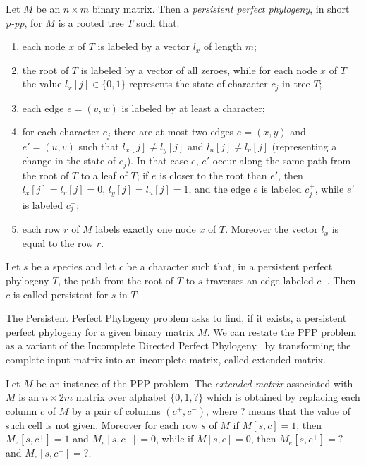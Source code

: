 \begin{definition}
\label{def:persistent-perfect-phylogeny}
Let $M$ be an  $n \times m$ binary matrix.
Then a \emph{persistent perfect phylogeny}, in short  \emph{ p-pp},
for $M$ is a rooted tree $T$ such that:
\begin{enumerate}
\item each node $x$ of $T$ is labeled by a vector $l_x$ of length $m$;
\item
  the root of $T$ is labeled by a vector of all zeroes,  while  for each  node
$x$ of $T$ the value $l_x[j]\in\{0, 1\}$
  represents the state of character $c_j$ in tree $T$;
\item
  each edge $e=(v,w)$ is labeled by at least a character;
\item
  for each character $c_j$ there are at most  two  edges $e=(x,y)$ and
$e'=(u,v)$
  such that $l_x[j] \neq l_y[j]$ and $l_u[j] \neq l_v[j]$
  (representing a change in the state of $c_j$).
In that case $e$, $e'$  occur along the same path
  from the root of $T$ to a leaf of $T$; if $e$ is closer to the root than $e'$,
  then $l_x[j]=l_v[j]=0$, $l_y[j]=l_u[j]=1$, and
  the  edge $e$ is labeled $c_j^{+}$,
  while  $e'$ is labeled $c_j^{-}$;
\item
  each row $r$ of $M$ labels exactly one node $x$ of $T$.
  Moreover the vector $l_{x}$ is equal to the row $r$.
\end{enumerate}
\end{definition}

Let $s$ be a species and let $c$ be a character such that, in a persistent
perfect phylogeny $T$, the path from the root of $T$ to $s$ traverses an edge
labeled $c^{-}$.
Then $c$ is called persistent for $s$ in $T$.

The Persistent Perfect Phylogeny problem asks to find, if it exists, a
persistent perfect phylogeny for a given binary matrix $M$.
We can restate the PPP  problem  as a
variant  of the Incomplete Directed Perfect Phylogeny~\cite{Sha} by transforming
the complete input matrix into an incomplete matrix, called extended matrix.

\begin{definition}
\label{def:Extended-Matrix}
Let $M$ be an instance of the PPP problem. The \emph{extended matrix}
associated with $M$ is an ${n \times 2m}$ matrix \me  over alphabet $\{0,1,?\}$
which is obtained by replacing each column $c$ of $M$ by a pair of columns
$(c^{+}, c^{-})$, where $?$ means that the value of such cell is not given.
Moreover for each   row $s$  of $M$
if $M[s,c] = 1$, then  $M_e[s,c^{+}] = 1$ and $M_e[s,c^{-}] = 0$,
while if $M[s,c] = 0$, then  $M_e[s,c^{+}] = ?$ and $M_e[s,c^{-}] = ?$.
\end{definition}

